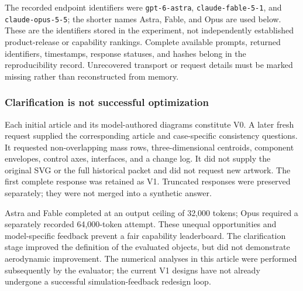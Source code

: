 \documentclass[11pt,a4paper]{article}
\begin{document}
The recorded endpoint identifiers were \texttt{gpt-6-astra}, \texttt{claude-fable-5-1}, and \texttt{claude-opus-5-5}; the shorter names Astra, Fable, and Opus are used below. These are the identifiers stored in the experiment, not independently established product-release or capability rankings. Complete available prompts, returned identifiers, timestamps, response statuses, and hashes belong in the reproducibility record. Unrecovered transport or request details must be marked missing rather than reconstructed from memory.

\subsubsection{Clarification is not successful optimization}
Each initial article and its model-authored diagrams constitute V0. A later fresh request supplied the corresponding article and case-specific consistency questions. It requested non-overlapping mass rows, three-dimensional centroids, component envelopes, control axes, interfaces, and a change log. It did not supply the original SVG or the full historical packet and did not request new artwork. The first complete response was retained as V1. Truncated responses were preserved separately; they were not merged into a synthetic answer.

Astra and Fable completed at an output ceiling of 32,000 tokens; Opus required a separately recorded 64,000-token attempt. These unequal opportunities and model-specific feedback prevent a fair capability leaderboard. The clarification stage improved the definition of the evaluated objects, but did not demonstrate aerodynamic improvement. The numerical analyses in this article were performed subsequently by the evaluator; the current V1 designs have not already undergone a successful simulation-feedback redesign loop.
\end{document}
